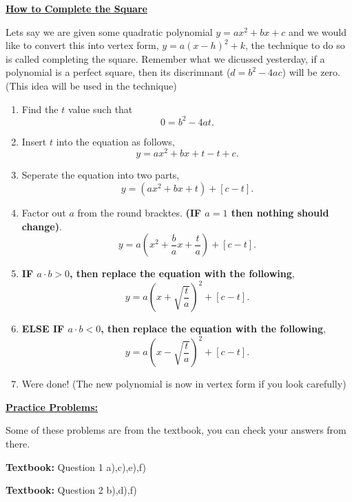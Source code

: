 \documentclass[12pt]{article} %
\begin{document}
\begin{center}
		\Huge{\underline{\textbf{How to Complete the Square}}}
\end{center}
	Lets say we are given some quadratic polynomial $y = ax^2 + bx + c$ and we would like to convert this into vertex form, $y =
	a(x - h)^2 + k$, the technique to do so is called completing the square. Remember what we dicussed yesterday, if a polynomial is
	a perfect square, then its discrimnant ($d = b^2 - 4ac$) will be zero. (This idea will be used in the technique)
	\begin{enumerate}
		\item Find the $t$ value such that \[
								0 = b^2 - 4at
		.\] 
	\item Insert $t$ into the equation as follows,
						\[
						y = ax^2 + bx + t - t + c
						.\] 
	\item Seperate the equation into two parts,
		\[
		y = (ax^2 + bx + t) + [c - t]
		.\] 
	\item Factor out $a$ from the round bracktes. \textbf{(IF $a = 1$ then nothing should change)}.
		     \[
		     y = a\left(x^2 + \frac{b}{a}x + \frac{t}{a}\right) + [c - t]
		     .\] 
	\item \textbf{IF $a\cdot b > 0$, then replace the equation with the following},
		 \[
					y = a\left( x + \sqrt{\frac{t}{a}} \right)^2 + [c - t] 
		.\] 
	\item \textbf{ELSE IF $a\cdot b < 0$, then replace the equation with the following},
		 \[
					y = a\left( x - \sqrt{\frac{t}{a}} \right)^2 + [c - t] 
		.\]  
	\item Were done! (The new polynomial is now in vertex form if you look carefully)
	\end{enumerate}


\textbf{\underline{\Large{Practice Problems:}}}

Some of these problems are from the textbook, you can check your answers from there.
\begin{qstn}
	\textbf{Textbook:} Question 1 a),c),e),f)
\end{qstn}

\begin{qstn}
	\textbf{Textbook:} Question 2 b),d),f)
\end{qstn}
\end{document}
